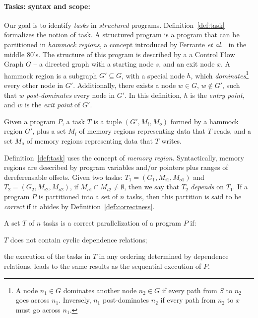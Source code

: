 \documentclass[sigplan,10pt,review,anonymous]{acmart}
\begin{document}
\paragraph{Tasks: syntax and scope:}
Our goal is to identify {\em tasks} in {\em structured} programs.
Definition~\ref{def:task} formalizes the notion of task.
A structured program is a program that can be partitioned in {\em hammock
regions}, a concept introduced by Ferrante {\em et al.}~\cite{Ferrante87} in
the middle 80's.
The structure of this program is described by a a Control Flow Graph $G$ --
a directed graph with a starting node $s$, and an exit node $x$.
A hammock region is a subgraph $G' \subseteq G$, with a special node
$h$, which {\em dominates}\footnote{A node $n_1 \in G$ dominates another node
$n_2 \in G$ if every path from  $S$ to $n_2$ goes across $n_1$.
Inversely, $n_1$ post-dominates $n_2$ if every path from $n_2$ to $x$ must
go across $n_1$.} every other node in $G'$.
Additionally, there exists a node $w \in G$, $w \notin G'$, such that
$w$ {\em post-dominates} every node in $G'$.
In this definition, $h$ is the {\em entry point}, and $w$ is the {\em exit point}
of $G'$.

\begin{definition}[Task]
\label{def:task}
Given a program $P$, a task $T$ is a tuple $(G', M_i, M_o)$ formed by a hammock
region $G'$, plus a set $M_i$ of memory regions representing data that $T$ reads,
and a set $M_o$ of memory regions representing data that $T$ writes.
\end{definition}

Definition~\ref{def:task} uses the concept of {\em memory region}.
Syntactically, memory regions are described by program variables and/or pointers
plus ranges of dereferensable offsets.
Given two tasks: $T_1 = (G_1, M_{i1}, M_{o1})$ and $T_2 = (G_2, M_{i2}, M_{o2})$,
if $M_{o1} \cap M_{i2} \neq \emptyset$, then we say that $T_2$ {\em depends} on
$T_1$.
If a program $P$ is partitioned into a set of $n$ tasks, then this partition is
said to be {\em correct} if it abides by Definition~\ref{def:correctness}.

\begin{definition}[Correctness]
\label{def:correctness}
A set $T$ of $n$ tasks is a correct parallelization of a program $P$ if:
\begin{compactenum}
\item $T$ does not contain cyclic dependence relations;
\item the execution of the tasks in $T$ in any ordering determined by dependence
relations, leads to the same results as the sequential execution of $P$.
\end{compactenum}
\end{definition}
\end{document}
